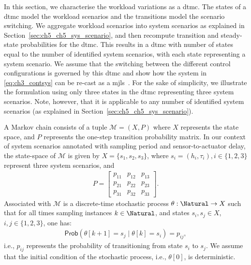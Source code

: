 In this section, we characterise the workload variations as a \gls{dtmc}. The states of a \gls{dtmc} model the workload scenarios and the transitions model the scenario switching. We aggregate workload scenarios into system scenarios as explained in Section~\ref{sec:ch5_ch5_sys_scenario}, and then recompute transition and steady-state probabilities for the \gls{dtmc}. This results in a \gls{dtmc} with number of states equal to the number of identified system scenarios, with each state representing a system scenario. 
We assume that the switching between the different control configurations is governed by this \gls{dtmc} and show how the system in \eqref{eq:ch3_contsys} can be re-cast as a \gls{mjls}~\cite{costa2006discrete}. For the sake of simplicity, we illustrate the formulation using only three states in the \gls{dtmc} representing three system scenarios. Note, however, that it is applicable to any number of identified system scenarios (as explained in Section~\ref{sec:ch5_ch5_sys_scenario}).

A Markov chain consists of a tuple $\mathcal{M} = (X, P)$ where $X$ represents the state space, and $P$ represents the one-step transition probability matrix. In our context of system scenarios annotated with sampling period and sensor-to-actuator delay, the state-space of $\mathcal{M}$ is given by $X = \{s_1, s_2, s_3\}$, 
where $s_i = (h_i,\tau_i), i \in \{1,2,3\}$ represent three system scenarios, and \begin{align}
P = 
\begin{bmatrix}
p_{11} & p_{12} & p_{13} \\
p_{21} & p_{22} & p_{23} \\
p_{31} & p_{32} & p_{33} \nonumber
\end{bmatrix}.
\end{align}
Associated with $\mathcal{M}$ is a discrete-time stochastic process $\theta : \Natural \rightarrow X$ such that for all times sampling instances $k \in \Natural$, and states $s_i, s_j \in X$, $i,j \in \{1,2,3\}$, one has:
\begin{align}
\mathsf{Prob}(\theta[k+1] = s_j \mid \theta[k] = s_i) = p_{ij}, \nonumber 
\end{align}
i.e., $p_{ij}$ represents the probability of transitioning from state $s_i$ to $s_j$. We assume that the initial condition of the stochastic process, i.e., $\theta[0]$, is deterministic. 

